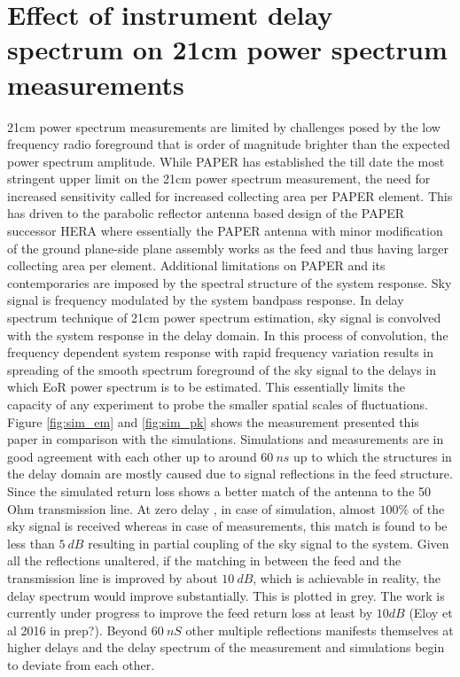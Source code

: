 \documentclass[twocolumn]{emulateapj}
\begin{document}
\section{\textbf{Effect of instrument delay spectrum on 21cm power spectrum measurements}}

21cm power spectrum measurements are limited by challenges posed by the low frequency radio foreground that is order of magnitude brighter than the expected power spectrum amplitude. While PAPER has established the till date the most stringent upper limit on the 21cm power spectrum measurement, the need for increased sensitivity called for increased collecting area per PAPER element. This has driven to the parabolic reflector antenna based design of the PAPER successor HERA where essentially the PAPER antenna with minor modification of the ground plane-side plane assembly works as the feed and thus having larger collecting area per element. Additional limitations on PAPER and its contemporaries are imposed by the spectral structure of the system response. Sky signal is frequency modulated by the system bandpass response. In delay spectrum technique of 21cm power spectrum estimation, sky signal is convolved with the system response in the delay domain. In this process of convolution, the frequency dependent system response with rapid frequency variation results in spreading of the smooth spectrum foreground of the sky signal to the delays in which EoR power spectrum is to be estimated. This essentially limits the capacity of any experiment to probe the smaller spatial scales of fluctuations. \\
 Figure \ref{fig:sim_em} and \ref{fig:sim_pk} shows the measurement presented this paper in comparison with the simulations. Simulations and measurements are in good agreement with each other up to around $60~ns$ up to which the structures in the delay domain are mostly caused due to signal reflections in the feed structure. Since the simulated return loss shows a better match of the antenna to the 50 Ohm transmission line. At zero delay , in case of simulation, almost $100\%$ of the sky signal is received whereas in case of measurements, this match is found to be less than $5~dB$ resulting in partial coupling of the sky signal to the system. Given all the reflections unaltered, if the matching in between the feed and the transmission line is improved by about $10~dB$, which is achievable in reality, the delay spectrum would improve substantially. This is plotted in grey. The work is currently under progress to improve the feed return loss at least by  $10dB$ (Eloy et al 2016 in prep?). Beyond $60~nS$ other multiple reflections manifests themselves at higher delays and the delay spectrum of the measurement and simulations begin to deviate from each other.\\
\end{document}
